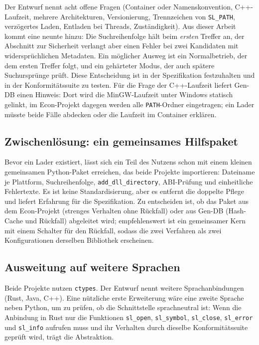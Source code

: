 Der Entwurf nennt acht offene Fragen (Container oder Namenskonvention, C++-Laufzeit, mehrere Architekturen, Versionierung, Trennzeichen von \texttt{SL\_PATH}, verzögertes Laden, Entladen bei Threads, Zuständigkeit). Aus dieser Arbeit kommt eine neunte hinzu: Die Suchreihenfolge hält beim \emph{ersten} Treffer an, der Abschnitt zur Sicherheit verlangt aber einen Fehler bei zwei Kandidaten mit widersprüchlichen Metadaten. Ein möglicher Ausweg ist ein Normalbetrieb, der dem ersten Treffer folgt, und ein gehärteter Modus, der auch spätere Suchursprünge prüft. Diese Entscheidung ist in der Spezifikation festzuhalten und in der Konformitätssuite zu testen. Für die Frage der C++-Laufzeit liefert Gen-DB einen Hinweis: Dort wird die MinGW-Laufzeit unter Windows statisch gelinkt, im Econ-Projekt dagegen werden alle \texttt{PATH}-Ordner eingetragen; ein Lader müsste beide Fälle abdecken oder die Laufzeit im Container erklären.

\subsection{Zwischenlösung: ein gemeinsames Hilfspaket}

Bevor ein Lader existiert, lässt sich ein Teil des Nutzens schon mit einem kleinen gemeinsamen Python-Paket erreichen, das beide Projekte importieren: Dateiname je Plattform, Suchreihenfolge, \texttt{add\_dll\_directory}, ABI-Prüfung und einheitliche Fehlertexte. Es ist keine Standardisierung, aber es entfernt die doppelte Pflege und liefert Erfahrung für die Spezifikation. Zu entscheiden ist, ob das Paket aus dem Econ-Projekt (strenges Verhalten ohne Rückfall) oder aus Gen-DB (Hash-Cache und Rückfall) abgeleitet wird; empfehlenswert ist ein gemeinsamer Kern mit einem Schalter für den Rückfall, sodass die zwei Verfahren als zwei Konfigurationen derselben Bibliothek erscheinen.

\subsection{Ausweitung auf weitere Sprachen}

Beide Projekte nutzen \texttt{ctypes}. Der Entwurf nennt weitere Sprachanbindungen (Rust, Java, C++). Eine nützliche erste Erweiterung wäre eine zweite Sprache neben Python, um zu prüfen, ob die Schnittstelle sprachneutral ist: Wenn die Anbindung in Rust nur die Funktionen \texttt{sl\_open}, \texttt{sl\_symbol}, \texttt{sl\_close}, \texttt{sl\_error} und \texttt{sl\_info} aufrufen muss und ihr Verhalten durch dieselbe Konformitätssuite geprüft wird, trägt die Abstraktion.

